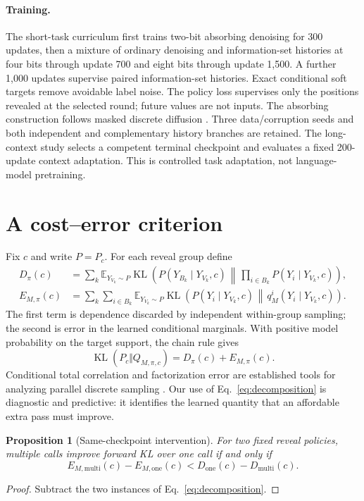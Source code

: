 \documentclass{article}
\newtheorem{proposition}{Proposition}
\newcommand{\KL}{\operatorname{KL}}
\newcommand{\E}{\mathbb E}
\begin{document}
\paragraph{Training.}
The short-task curriculum first trains two-bit absorbing denoising for 300
updates, then a mixture of ordinary denoising and information-set histories
at four bits through update 700 and eight bits through update 1,500.
A further 1,000 updates supervise paired information-set histories.
Exact conditional soft targets remove avoidable label noise. The policy loss
supervises only the positions revealed at the selected round; future values
are not inputs. The absorbing construction follows masked discrete diffusion
\citep{d3pm,mdlm}. Three data/corruption seeds and both independent and
complementary history branches are retained. The long-context study selects
a competent terminal checkpoint and evaluates a fixed 200-update context
adaptation. This is controlled task adaptation, not language-model pretraining.

\section{A cost--error criterion}
Fix $c$ and write $P=P_c$. For each reveal group define
\begin{align}
 D_\pi(c)&=\sum_k\E_{Y_{V_k}\sim P}
 \KL\!\left(P(Y_{B_k}\mid Y_{V_k},c)\,\middle\Vert\,
       \prod_{i\in B_k}P(Y_i\mid Y_{V_k},c)\right),\\
 E_{M,\pi}(c)&=\sum_k\sum_{i\in B_k}\E_{Y_{V_k}\sim P}
 \KL\!\left(P(Y_i\mid Y_{V_k},c)\,\middle\Vert\,
       q_M^i(Y_i\mid Y_{V_k},c)\right).
\end{align}
The first term is dependence discarded by independent within-group sampling;
the second is error in the learned conditional marginals. With positive model
probability on the target support, the chain rule gives
\begin{equation}
 \KL(P_c\Vert Q_{M,\pi,c})=D_\pi(c)+E_{M,\pi}(c).
 \label{eq:decomposition}
\end{equation}
Conditional total correlation and factorization error are established tools
for analyzing parallel discrete sampling
\citep{factorization2025,ctcdepth2026,intrinsicdependence2026}.
Our use of Eq.~\eqref{eq:decomposition} is diagnostic and predictive: it identifies
the learned quantity that an affordable extra pass must improve.

\begin{proposition}[Same-checkpoint intervention]
For two fixed reveal policies, multiple calls improve forward KL over one call
if and only if
\begin{equation}
 E_{M,\mathrm{multi}}(c)-E_{M,\mathrm{one}}(c)
 <D_{\mathrm{one}}(c)-D_{\mathrm{multi}}(c).
 \label{eq:intervention}
\end{equation}
\end{proposition}
\begin{proof}
Subtract the two instances of Eq.~\eqref{eq:decomposition}.
\end{proof}
\end{document}
